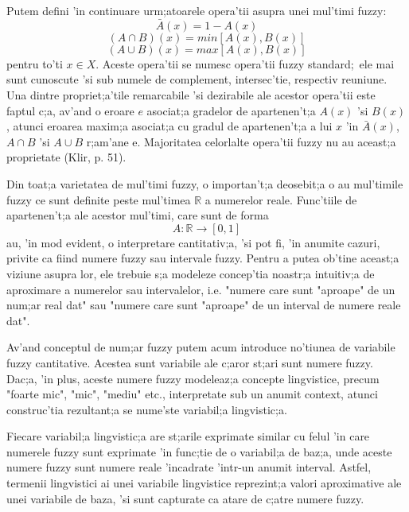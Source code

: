 \par
Putem defini 'in continuare urm;atoarele opera'tii asupra unei mul'timi fuzzy:
\begin{equation}
\bar{A}(x) = 1 - A(x)
\end{equation}
\begin{equation}
(A \cap B) (x) = min[A(x), B(x)]
\end{equation}
\begin{equation}
(A \cup B) (x) = max[A(x), B(x)]
\end{equation}
pentru to'ti $x \in X$. Aceste opera'tii se numesc opera'tii fuzzy standard;\ ele mai sunt cunoscute 'si sub numele de complement, intersec'tie, respectiv reuniune. Una dintre propriet;a'tile remarcabile 'si dezirabile ale acestor opera'tii este faptul c;a, av'and o eroare $e$ asociat;a gradelor de apartenen't;a $A(x)$ 'si $B(x)$, atunci eroarea maxim;a asociat;a cu gradul de apartenen't;a a lui $x$ 'in $\bar{A}(x)$, $A \cap B$ 'si $A \cup B$ r;am'ane e. Majoritatea celorlalte opera'tii fuzzy nu au aceast;a proprietate (Klir, p. 51).
\par
Din toat;a varietatea de mul'timi fuzzy, o importan't;a deosebit;a o au mul'timile fuzzy ce sunt definite peste mul'timea $\mathbb{R}$ a numerelor reale. Func'tiile de apartenen't;a ale acestor mul'timi, care sunt de forma
\begin{equation}
A : \mathbb{R} \to [0, 1]
\end{equation}
au, 'in mod evident, o interpretare cantitativ;a, 'si pot fi, 'in anumite cazuri, privite ca fiind numere fuzzy sau intervale fuzzy. Pentru a putea ob'tine aceast;a viziune asupra lor, ele trebuie s;a modeleze concep'tia noastr;a intuitiv;a de aproximare a numerelor sau intervalelor, i.e. "numere care sunt "aproape" de un num;ar real dat" sau "numere care sunt "aproape" de un interval de numere reale dat".
\par
Av'and conceptul de num;ar fuzzy putem acum introduce no'tiunea de variabile fuzzy cantitative. Acestea sunt variabile ale c;aror st;ari sunt numere fuzzy. Dac;a, 'in plus, aceste numere fuzzy modeleaz;a concepte lingvistice, precum "foarte mic", "mic", "mediu" etc., interpretate sub un anumit context, atunci construc'tia rezultant;a se nume'ste variabil;a lingvistic;a.
\par
Fiecare variabil;a lingvistic;a are st;arile exprimate similar cu felul 'in care numerele fuzzy sunt exprimate 'in func;tie de o variabil;a de baz;a, unde aceste numere fuzzy sunt numere reale 'incadrate 'intr-un anumit interval. Astfel, termenii lingvistici ai unei variabile lingvistice reprezint;a valori aproximative ale unei variabile de baza, 'si sunt capturate ca atare de c;atre numere fuzzy.
